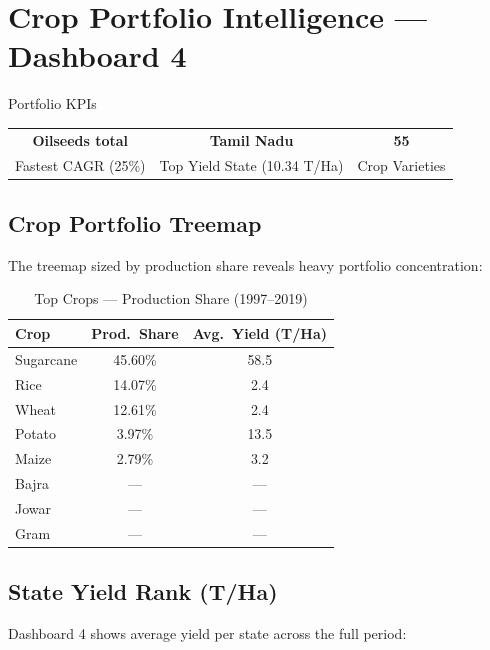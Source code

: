 \documentclass[10pt]{article}
\begin{document}
\section{Crop Portfolio Intelligence — Dashboard 4}

\begin{kpibox}{Portfolio KPIs}
  \begin{center}
    \begin{tabular}{ccc}
      \large\textcolor{kpiblue}{\textbf{Oilseeds total}} &
      \large\textcolor{kpiblue}{\textbf{Tamil Nadu}} &
      \large\textcolor{kpiblue}{\textbf{55}} \\[2pt]
      \small Fastest CAGR (25\%) & \small Top Yield State (10.34 T/Ha) & \small Crop Varieties
    \end{tabular}
  \end{center}
\end{kpibox}

\subsection{Crop Portfolio Treemap}
The treemap sized by production share reveals heavy portfolio concentration:

\begin{table}[H]
  \centering
  \caption{Top Crops — Production Share (1997–2019)}
  \label{tab:portfolio}
  \small
  \begin{tabular}{lcc}
    \toprule
    \textbf{Crop} & \textbf{Prod.\ Share} & \textbf{Avg.\ Yield (T/Ha)} \\
    \midrule
    Sugarcane    & 45.60\% & 58.5 \\
    Rice         & 14.07\% &  2.4 \\
    Wheat        & 12.61\% &  2.4 \\
    Potato       &  3.97\% & 13.5 \\
    Maize        &  2.79\% &  3.2 \\
    Bajra        & --- & --- \\
    Jowar        & --- & --- \\
    Gram         & --- & --- \\
    \bottomrule
  \end{tabular}
\end{table}

\subsection{State Yield Rank (T/Ha)}
Dashboard 4 shows average yield per state across the full period:
\end{document}
